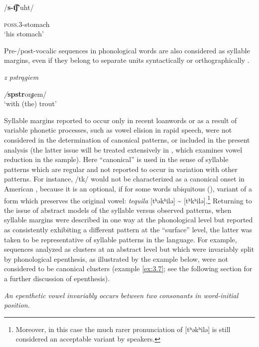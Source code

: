 \ea\label{ex:3.5}

/\textbf{s-t͡ʃ’}uht/

\textsc{poss.3}-stomach\\
\glt ‘his stomach’
\citep[24]{Polian2006}
\z

Pre-/post-vocalic sequences in phonological words are also considered as syllable margins, even if they belong to separate units syntactically or orthographically .

\ea\label{ex:3.6}

\textit{z pstrągiem}

\textit{/}\textbf{spstr}oŋɟem/\\
\glt ‘with (the) trout’
\citep[103]{Jassem2003}
\z

  Syllable margins reported to occur only in recent loanwords or as a result of variable phonetic processes, such as vowel elision in rapid speech, were not considered in the determination of canonical patterns, or included in the present analysis (the latter issue will be treated extensively in , which examines vowel reduction in the sample). Here ``canonical'' is used in the sense of syllable patterns which are regular and not reported to occur in variation with other patterns. For instance, /tk/ would not be characterized as a canonical onset in American , because it is an optional, if for some words ubiquitous (\citealt{NapoleãodeSouza2019}), variant of a form which preserves the original vowel: \textit{tequila} [tʰəkʰilə] {\textasciitilde} [tʰkʰilə].\footnote{{Moreover, in this case the much rarer pronunciation of [tʰəkʰilə] is still considered an acceptable variant by speakers.}} Returning to the issue of abstract models of the syllable versus observed patterns, when syllable margins were described in one way at the phonological level but reported as consistently exhibiting a different pattern at the ``surface'' level, the latter was taken to be representative of syllable patterns in the language. For example, sequences analyzed as clusters at an abstract level but which were invariably split by phonological epenthesis, as illustrated by the  example below, were not considered to be canonical clusters (example \ref{ex:3.7}; see the following section for a further discussion of epenthesis).

\ea\label{ex:3.7}

\textit{An epenthetic vowel invariably occurs between two consonants in word-initial position.}

